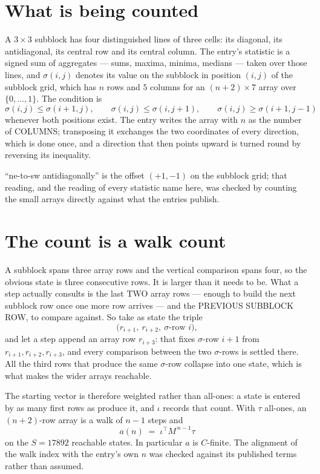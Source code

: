 \documentclass[11pt,a4paper]{article}
\theoremstyle{plain}
\theoremstyle{definition}
\begin{document}
\section{What is being counted}

A $3\times3$ subblock has four distinguished lines of three cells: its diagonal, its
antidiagonal, its central row and its central column. The entry's statistic is a signed sum of
aggregates --- sums, maxima, minima, medians --- taken over those lines, and $\sigma(i,j)$
denotes its value on the subblock in position $(i,j)$ of the subblock grid, which has $n$ rows
and $5$ columns for an $(n+2)\times7$ array over $\{0,\dots,1\}$. The condition is
\[
\sigma(i,j)\le\sigma(i+1,j),\qquad \sigma(i,j)\le\sigma(i,j+1),\qquad \sigma(i,j)\ge\sigma(i+1,j-1)
\]
whenever both positions exist. The entry writes the array with $n$ as the number of COLUMNS; transposing it exchanges the two coordinates of every direction, which is done once, and a direction that then points upward is turned round by reversing its inequality.

``ne-to-sw antidiagonally'' is the offset $(+1,-1)$ on the subblock grid; that reading, and
the reading of every statistic name here, was checked by counting the small arrays directly
against what the entries publish.

\section{The count is a walk count}

A subblock spans three array rows and the vertical comparison spans four, so the obvious state
is three consecutive rows. It is larger than it needs to be. What a step actually consults is
the last TWO array rows --- enough to build the next subblock row once one more row arrives ---
and the PREVIOUS SUBBLOCK ROW, to compare against. So take as state the triple
\[
\bigl(r_{i+1},\ r_{i+2},\ \sigma\text{-row }i\bigr),
\]
and let a step append an array row $r_{i+3}$: that fixes $\sigma$-row $i+1$ from
$r_{i+1},r_{i+2},r_{i+3}$, and every comparison between the two $\sigma$-rows is settled
there. All the third rows that produce the same $\sigma$-row collapse into one state, which is
what makes the wider arrays reachable.

The starting vector is therefore weighted rather than all-ones: a state is entered by as many
first rows as produce it, and $\iota$ records that count. With $\tau$ all-ones, an
$(n+2)$-row array is a walk of $n-1$ steps and
\[
a(n)\;=\;\iota^{\!\top}M^{\,n-1}\tau
\]
on the $S=17892$ reachable states. In particular $a$ is $C$-finite. The alignment of the walk
index with the entry's own $n$ was checked against its published terms rather than assumed.
\end{document}
